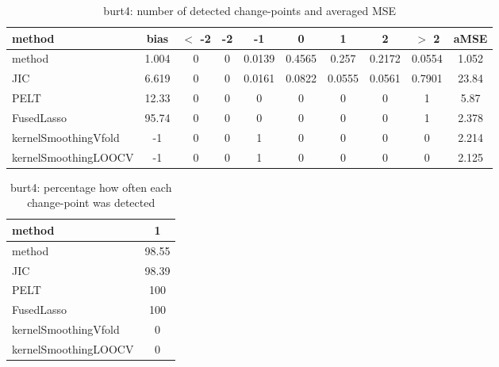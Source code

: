 \begin{table}[ht]
\centering
\begin{tabular}{l|c|ccccccc|c}
  \hline
method & bias & $<$ -2 & -2 & -1 & 0 & 1 & 2 & $>$ 2 & aMSE \\ 
  \hline
method & 1.004 &     0 &     0 & 0.0139 & 0.4565 & 0.257 & 0.2172 & 0.0554 & 1.052 \\ 
  JIC & 6.619 &     0 &     0 & 0.0161 & 0.0822 & 0.0555 & 0.0561 & 0.7901 & 23.84 \\ 
  PELT & 12.33 &     0 &     0 &     0 &     0 &     0 &     0 &     1 &  5.87 \\ 
  FusedLasso & 95.74 &     0 &     0 &     0 &     0 &     0 &     0 &     1 & 2.378 \\ 
  kernelSmoothingVfold &    -1 &     0 &     0 &     1 &     0 &     0 &     0 &     0 & 2.214 \\ 
  kernelSmoothingLOOCV &    -1 &     0 &     0 &     1 &     0 &     0 &     0 &     0 & 2.125 \\ 
   \hline
\end{tabular}
\caption{burt4: number of detected change-points and averaged MSE} 
\label{tab:burt4Njumps}
\end{table}
\begin{table}[ht]
\centering
\begin{tabular}{l|c}
  \hline
method & 1 \\ 
  \hline
method &  98.55 \\ 
  JIC &  98.39 \\ 
  PELT &    100 \\ 
  FusedLasso &    100 \\ 
  kernelSmoothingVfold &      0 \\ 
  kernelSmoothingLOOCV &      0 \\ 
   \hline
\end{tabular}
\caption{burt4: percentage how often each change-point was detected} 
\label{tab:burt4Detections}
\end{table}
